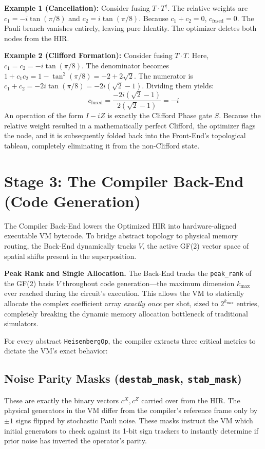 \documentclass[11pt]{article}
\begin{document}
\textbf{Example 1 (Cancellation):} Consider fusing $T \cdot T^\dagger$. The relative weights are $c_1 = -i \tan(\pi/8)$ and $c_2 = i \tan(\pi/8)$. Because $c_1 + c_2 = 0$, $c_{\text{fused}} = 0$. The Pauli branch vanishes entirely, leaving pure Identity. The optimizer deletes both nodes from the HIR.

\textbf{Example 2 (Clifford Formation):} Consider fusing $T \cdot T$. Here, $c_1 = c_2 = -i\tan(\pi/8)$. The denominator becomes $1 + c_1 c_2 = 1 - \tan^2(\pi/8) = -2 + 2\sqrt{2}$. The numerator is $c_1 + c_2 = -2i\tan(\pi/8) = -2i(\sqrt{2}-1)$. Dividing them yields:
\begin{equation}
    c_{\text{fused}} = \frac{-2i(\sqrt{2}-1)}{2(\sqrt{2}-1)} = -i
\end{equation}
An operation of the form $I - i Z$ is exactly the Clifford Phase gate $S$. Because the relative weight resulted in a mathematically perfect Clifford, the optimizer flags the node, and it is subsequently folded back into the Front-End's topological tableau, completely eliminating it from the non-Clifford state.

\section{Stage 3: The Compiler Back-End (Code Generation)}

The Compiler Back-End lowers the Optimized HIR into hardware-aligned executable VM bytecode. To bridge abstract topology to physical memory routing, the Back-End dynamically tracks $V$, the active GF(2) vector space of spatial shifts present in the superposition.

\textbf{Peak Rank and Single Allocation.} The Back-End tracks the \texttt{peak\_rank} of the GF(2) basis $V$ throughout code generation---the maximum dimension $k_{\max}$ ever reached during the circuit's execution. This allows the VM to statically allocate the complex coefficient array \textit{exactly once} per shot, sized to $2^{k_{\max}}$ entries, completely breaking the dynamic memory allocation bottleneck of traditional simulators.

For every abstract \texttt{HeisenbergOp}, the compiler extracts three critical metrics to dictate the VM's exact behavior:

\subsection{Noise Parity Masks (\texttt{destab\_mask}, \texttt{stab\_mask})}
These are exactly the binary vectors $c^X, c^Z$ carried over from the HIR. The physical generators in the VM differ from the compiler's reference frame only by $\pm 1$ signs flipped by stochastic Pauli noise. These masks instruct the VM which initial generators to check against its 1-bit sign trackers to instantly determine if prior noise has inverted the operator's parity.
\end{document}
